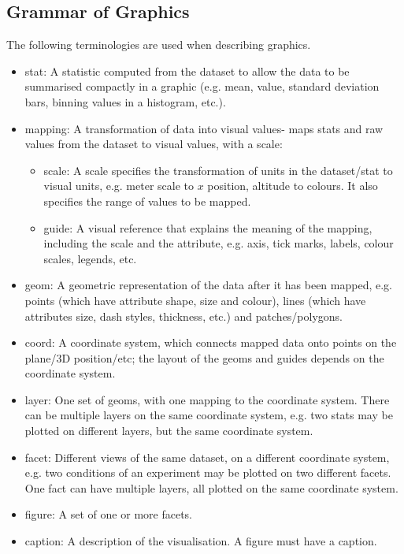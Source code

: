 \documentclass[a4paper, openany]{memoir}
\begin{document}
\subsection{Grammar of Graphics}
The following terminologies are used when describing graphics.
\begin{itemize}
    \item stat: A statistic computed from the dataset to allow the data to be summarised compactly in a graphic (e.g. mean, value, standard deviation bars, binning values in a histogram, etc.).
    
    \item mapping: A transformation of data into visual values- maps stats and raw values from the dataset to visual values, with a scale:
    \begin{itemize}
        \item scale: A scale specifies the transformation of units in the dataset/stat to visual units, e.g. meter scale to $x$ position, altitude to colours. It also specifies the range of values to be mapped.
        \item guide: A visual reference that explains the meaning of the mapping, including the scale and the attribute, e.g. axis, tick marks, labels, colour scales, legends, etc.
    \end{itemize}

    \item geom: A geometric representation of the data after it has been mapped, e.g. points (which have attribute shape, size and colour), lines (which have attributes size, dash styles, thickness, etc.) and patches/polygons.
    
    \item coord: A coordinate system, which connects mapped data onto points on the plane/3D position/etc; the layout of the geoms and guides depends on the coordinate system.
    
    \item layer: One set of geoms, with one mapping to the coordinate system. There can be multiple layers on the same coordinate system, e.g. two stats may be plotted on different layers, but the same coordinate system.
    
    \item facet: Different views of the same dataset, on a different coordinate system, e.g. two conditions of an experiment may be plotted on two different facets. One fact can have multiple layers, all plotted on the same coordinate system.
    
    \item figure: A set of one or more facets.
    
    \item caption: A description of the visualisation. A figure must have a caption.
\end{itemize}
\end{document}
